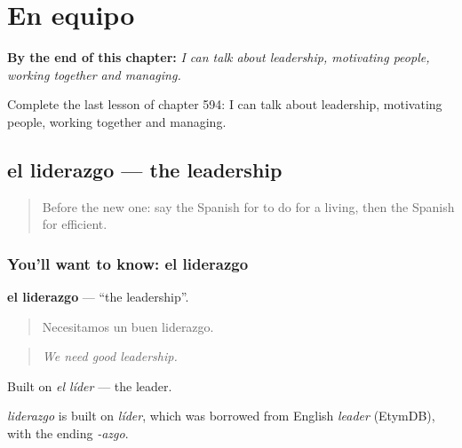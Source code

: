 
\chapter{En equipo}
\label{ch:es-en-equipo}

\begin{chapteropening}
\textbf{By the end of this chapter:} \emph{I can talk about leadership, motivating people, working together and managing.}

Complete the last lesson of chapter 594: I can talk about leadership, motivating people, working together and managing.
\end{chapteropening}

\section[el liderazgo]{el liderazgo — the leadership}

\label{lesson:ES-C594-liderazgo}



\begin{quote}
Before the new one: say the Spanish for to do for a living, then the Spanish for efficient.
\end{quote}

\subsection*{You'll want to know: el liderazgo}
\textbf{el liderazgo} — \textquotedblleft{}the leadership\textquotedblright{}.

\begin{quote}
Necesitamos un buen liderazgo.
\end{quote}

\begin{quote}
\emph{We need good leadership.}
\end{quote}

Built on \emph{el líder} — the leader.

\begin{cousinweb}
\emph{liderazgo} is built on \emph{líder}, which was borrowed from English \emph{leader} (EtymDB), with the ending \emph{-azgo}.
\end{cousinweb}

